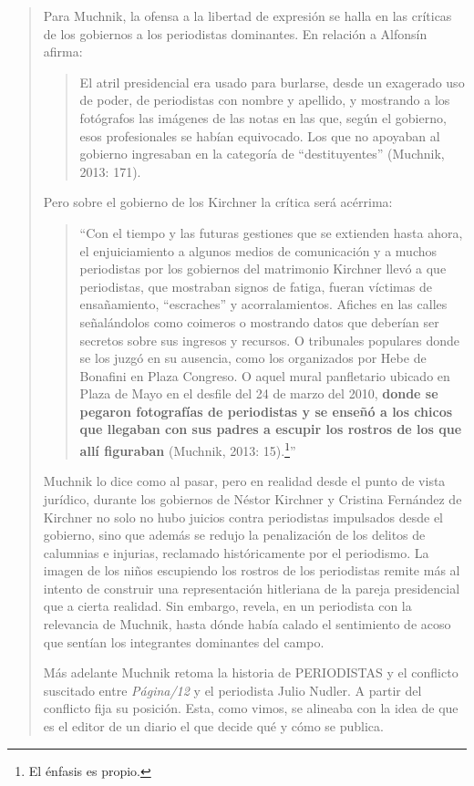 \begin{quote}
Para Muchnik, la ofensa a la libertad de expresión se halla en las críticas de los gobiernos a los periodistas dominantes. En relación a Alfonsín afirma:

\begin{quote}
	El atril presidencial era usado para burlarse, desde un exagerado uso de poder, de periodistas con nombre y apellido, y mostrando a los fotógrafos las imágenes de las notas en las que, según el gobierno, esos profesionales se habían equivocado. Los que no apoyaban al gobierno ingresaban en la categoría de ``destituyentes'' (Muchnik, 2013: 171).
\end{quote}


Pero sobre el gobierno de los Kirchner la crítica será acérrima:

\begin{quote}
	\enquote{Con el tiempo y las futuras gestiones que se extienden hasta ahora, el enjuiciamiento a algunos medios de comunicación y a muchos periodistas por los gobiernos del matrimonio Kirchner llevó a que periodistas, que mostraban signos de fatiga, fueran víctimas de ensañamiento, ``escraches'' y acorralamientos. Afiches en las calles señalándolos como coimeros o mostrando datos que deberían ser secretos sobre sus ingresos y recursos. O tribunales populares donde se los juzgó en su ausencia, como los organizados por Hebe de Bonafini en Plaza Congreso. O aquel mural panfletario ubicado en Plaza de Mayo en el desfile del 24 de marzo del 2010, \textbf{donde se pegaron fotografías de periodistas y se enseñó a los chicos que llegaban con sus padres a escupir los rostros de los que allí figuraban} (Muchnik, 2013: 15).\footnote{El énfasis es propio.}}
\end{quote}


Muchnik lo dice como al pasar, pero en realidad desde el punto de vista jurídico, durante los gobiernos de Néstor Kirchner y Cristina Fernández de Kirchner no solo no hubo juicios contra periodistas impulsados desde el gobierno, sino que además se redujo la penalización de los delitos de calumnias e injurias, reclamado históricamente por el periodismo. La imagen de los niños escupiendo los rostros de los periodistas remite más al intento de construir una representación hitleriana de la pareja presidencial que a cierta realidad. Sin embargo, revela, en un periodista con la relevancia de Muchnik, hasta dónde había calado el sentimiento de acoso que sentían los integrantes dominantes del campo.

Más adelante Muchnik retoma la historia de PERIODISTAS y el conflicto suscitado entre \emph{Página/12} y el periodista Julio Nudler. A partir del conflicto fija su posición. Esta, como vimos, se alineaba con la idea de que es el editor de un diario el que decide qué y cómo se publica.


\end{quote}
